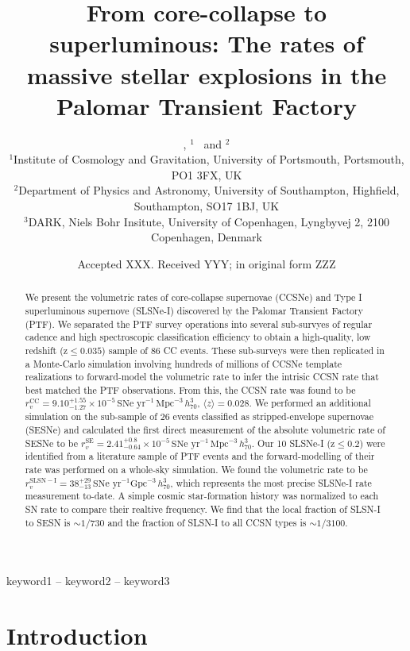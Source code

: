 \documentclass[a4paper,fleqn,usenatbib]{mnras}
\title[The Rates of Core Collapse Events in PTF]{From core-collapse to superluminous: The rates of massive stellar explosions in the Palomar Transient Factory}
\author[C. Frohmaier et al.]{
\chris{C. Frohmaier,$^{1}$\thanks{E-mail: chris.frohmaier@port.ac.uk}}
\angus{C.~R.~Angus,$^{2,3}$}, \maria{M.  Vincenzi}$^{1}$~ and \marksul{M. Sullivan}$^{2}$
\\
$^{1}$Institute of Cosmology and Gravitation, University of Portsmouth, Portsmouth, PO1 3FX, UK\\
$^{2}$Department of Physics and Astronomy, University of Southampton, Highfield, Southampton, SO17 1BJ, UK\\
$^{3}$DARK, Niels Bohr Insitute, University of Copenhagen, Lyngbyvej 2, 2100 Copenhagen, Denmark
}
\date{Accepted XXX. Received YYY; in original form ZZZ}
\begin{document}
\label{firstpage}
\pagerange{\pageref{firstpage}--\pageref{lastpage}}
\maketitle

\begin{abstract}
    We present the volumetric rates of core-collapse supernovae (CCSNe) and Type I superluminous supernove (SLSNe-I) discovered by the Palomar Transient Factory (PTF). We separated the PTF survey operations into several sub-survyes of regular cadence and high spectroscopic classification efficiency to obtain a high-quality, low redshift (z${\le}0.035$) sample of 86 CC events. These sub-surveys were then replicated in a Monte-Carlo simulation involving hundreds of millions of CCSNe template realizations to forward-model the volumetric rate to infer the intrisic CCSN rate that best matched the PTF observations. From this, the CCSN rate was found to be $r^\mathrm{CC}_v=9.10_{-1.27}^{+1.55}\times10^{-5}\,\text{SNe yr}^{-1}\,\text{Mpc}^{-3}\, h_{70}^{3}$, $ \langle z \rangle = 0.028$. We performed an additional simulation on the sub-sample of 26 events classified as stripped-envelope supernovae (SESNe) and calculated the first direct measurement of the absolute volumetric rate of SESNe to be $r^\mathrm{SE}_v=2.41_{-0.64}^{+0.8}\times10^{-5}\, \text{SNe yr}^{-1}\,\text{Mpc}^{-3}\, h_{70}^{3}$. Our 10 SLSNe-I (z${\le}0.2$) were identified from a literature sample of PTF events and the forward-modelling of their rate was performed on a whole-sky simulation. We found the volumetric rate to be $r^\mathrm{SLSN-I}_v=38_{-13}^{+29}\, \text{SNe yr}^{-1}\text{Gpc}^{-3}\, h_{70}^{3}$, which represents the most precise SLSNe-I rate measurement to-date. A simple cosmic star-formation history was normalized to each SN rate to compare their realtive frequency. We find that the local fraction of SLSN-I to SESN is $\sim1/730$ and the fraction of SLSN-I to all CCSN types is $\sim 1/3100$.
\end{abstract}

\begin{keywords}
keyword1 -- keyword2 -- keyword3
\end{keywords}


\section{Introduction}
\end{document}
